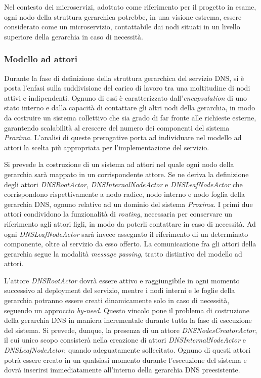 \documentclass[a4paper,12pt]{report}
\begin{document}
Nel contesto dei microservizi, adottato come riferimento per il progetto in esame, ogni nodo della struttura gerarchica potrebbe, in una visione estrema, essere considerato come un microservizio, contattabile dai nodi situati in un livello superiore della gerarchia in caso di necessità.

\subsubsection{Modello ad attori} \label{dns-actormodel}
Durante la fase di definizione della struttura gerarchica del servizio DNS, si è posta l'enfasi sulla suddivisione del carico di lavoro tra una moltitudine di nodi attivi e indipendenti. Ognuno di essi è caratterizzato dall'\emph{encapsulation} di uno stato interno e dalla capacità di contattare gli altri nodi della gerarchia, in modo da costruire un sistema collettivo che sia grado di far fronte alle richieste esterne, garantendo scalabilità al crescere del numero dei componenti del sistema \emph{Proxima}. L'analisi di queste prerogative porta ad individuare nel modello ad attori la scelta più appropriata per l'implementazione del servizio.

Si prevede la costruzione di un sistema ad attori nel quale ogni nodo della gerarchia sarà mappato in un corrispondente attore. Se ne deriva la definizione degli attori \emph{DNSRootActor}, \emph{DNSInternalNodeActor} e \emph{DNSLeafNodeActor} che corrispondono rispettivamente a nodo radice, nodo interno e nodo foglia della gerarchia DNS, ognuno relativo ad un dominio del sistema \emph{Proxima}. I primi due attori condividono la funzionalità di \emph{routing}, necessaria per conservare un riferimento agli attori figli, in modo da poterli contattare in caso di necessità. Ad ogni \emph{DNSLeafNodeActor} sarà invece assegnato il riferimento di un determinato componente, oltre al servizio da esso offerto. La comunicazione fra gli attori della gerarchia segue la modalità \emph{message passing}, tratto distintivo del modello ad attori.

L'attore \emph{DNSRootActor} dovrà essere attivo e raggiungibile in ogni momento successivo al deployment del servizio, mentre i nodi interni e le foglie della gerarchia potranno essere creati dinamicamente solo in caso di necessità, seguendo un approccio \emph{by-need}. Questo vincolo pone il problema di costruzione della gerarchia DNS in maniera incrementale durante tutta la fase di esecuzione del sistema. Si prevede, dunque, la presenza di un attore \emph{DNSNodesCreatorActor}, il cui unico scopo consisterà nella creazione di attori \emph{DNSInternalNodeActor} e \emph{DNSLeafNodeActor}, quando adeguatamente sollecitato. Ognuno di questi attori potrà essere creato in un qualsiasi momento durante l'esecuzione del sistema e dovrà inserirsi immediatamente all'interno della gerarchia DNS preesistente. 
\end{document}
